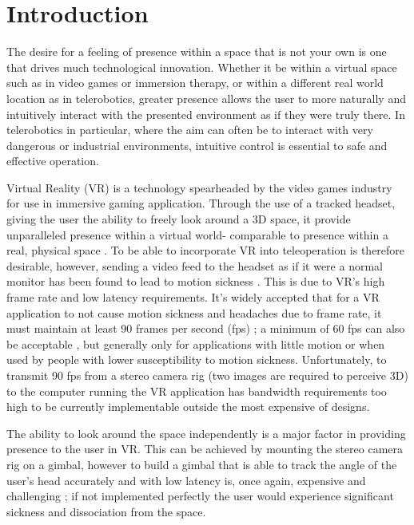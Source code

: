 \chapter{Introduction}

The desire for a feeling of presence \cite{presence} within a space that is not your own is one that drives much technological innovation. Whether it be within a virtual space such as in video games or immersion therapy, or within a different real world location as in telerobotics, greater presence allows the user to more naturally and intuitively interact with the presented environment as if they were truly there. In telerobotics in particular, where the aim can often be to interact with very dangerous or industrial environments, intuitive control is essential to safe and effective operation.

Virtual Reality (VR) is a technology spearheaded by the video games industry for use in immersive gaming application. Through the use of a tracked headset, giving the user the ability to freely look around a 3D space, it provide unparalleled presence within a virtual world- comparable to presence within a real, physical space \cite{loomis2016presence,McGlynn}. To be able to incorporate VR into teleoperation is therefore desirable, however, sending a video feed to the headset as if it were a normal monitor has been found to lead to motion sickness \cite{han2017design}. This is due to VR's high frame rate and low latency requirements. It's widely accepted that for a VR application to not cause motion sickness and headaches due to frame rate, it must maintain at least 90 frames per second (fps) \cite{FrameRate}; a minimum of 60 fps can also be acceptable \cite{Borg2013UsingAG}, but generally only for applications with little motion or when used by people with lower susceptibility to motion sickness. Unfortunately, to transmit 90 fps from a stereo camera rig (two images are required to perceive 3D) to the computer running the VR application has bandwidth requirements too high to be currently implementable outside the most expensive of designs.

The ability to look around the space independently is a major factor in providing presence to the user in VR. This can be achieved by mounting the stereo camera rig on a gimbal, however to build a gimbal that is able to track the angle of the user's head accurately and with low latency is, once again, expensive and challenging \cite{DORA}; if not implemented perfectly the user would experience significant sickness and dissociation from the space.


